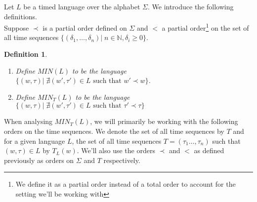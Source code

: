 \documentclass[a4paper,12pt]{article}
\theoremstyle{break}
\newtheorem{definition}[theorem]{Definition}
\newcommand{\N}{\mathbb{N}}
\begin{document}
Let $L$ be a timed language over the alphabet $\Sigma$. We introduce the following definitions.\\

Suppose $\prec$ is a partial order defined on $\Sigma$ and $<$ a partial order\footnote{We define it as a partial order instead of a total order to account for the setting we'll be working with } on the set of all time sequences $\{(\delta_1,\dots,\delta_n)|\;n\in \N, \delta_i\geq 0\}$.
\begin{definition}
    \begin{enumerate}
        \item Define $MIN(L)$ to be the language $\{(w,\tau)|\; \nexists (w',\tau')\in L \text{ such that }w'\prec w \}$.
        \item Define $MIN_T(L)$ to be the language $\{(w,\tau)|\; \nexists (w',\tau')\in L \text{ such that }\tau'\prec \tau\}$
    \end{enumerate}
\end{definition}

When analysing $MIN_T(L)$, we will primarily be working with the following orders on the time sequences. We denote the set of all time sequences by $T$ and for a given language $L$, the set of all time sequences $T=(\tau_1\dots,\tau_n)$ such that $(w,\tau)\in L$ by $T_L(w)$. We'll also use the orders $\prec$ and $<$ as defined previously as orders on $\Sigma$ and $T$ respectively.\\
\end{document}
